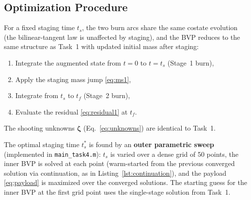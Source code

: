 \documentclass[../main.tex]{subfiles}
\begin{document}
\subsection{Optimization Procedure}

For a fixed staging time $t_s$, the two burn arcs share the same costate evolution (the bilinear-tangent law is unaffected by staging), and the BVP reduces to the same structure as Task~1 with updated initial mass after staging:
\begin{enumerate}
    \item Integrate the augmented state from $t = 0$ to $t = t_s$ (Stage~1 burn),
    \item Apply the staging mass jump \eqref{eq:ms1},
    \item Integrate from $t_s$ to $t_f$ (Stage~2 burn),
    \item Evaluate the residual \eqref{eq:residual1} at $t_f$.
\end{enumerate}
The shooting unknowns $\boldsymbol{\zeta}$ (Eq.~\ref{eq:unknowns}) are identical to Task~1.

The optimal staging time $t_s^*$ is found by an \textbf{outer parametric sweep} (implemented in \texttt{main\_task4.m}): $t_s$ is varied over a dense grid of 50 points, the inner BVP is solved at each point (warm-started from the previous converged solution via continuation, as in Listing~\ref{lst:continuation}), and the payload \eqref{eq:payload} is maximized over the converged solutions. The starting guess for the inner BVP at the first grid point uses the single-stage solution from Task~1.
\end{document}

